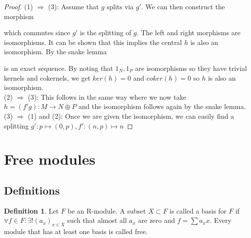 \documentclass{article}
\theoremstyle{definition}
\newtheorem{definition}{Definition}[subsection]
\theoremstyle{remark}
\theoremstyle{plain}
\begin{document}
\begin{proof}
    (1) \(\Rightarrow\) (3): Assume that \(g\) splits via \(g'\). We can then construct the morphism
    \begin{figure}[h]
        \centering
    \end{figure}
    which commutes since \(g'\) is the splitting of \(g\).
    The left and right morphisms are isomorphisms. It can be shown that this implies the central \(h\) is also an isomorphism. By the snake lemma \\
     is an exact sequence. By noting that \(1_N, 1_P\) are isomorphisms so they have trivial kernels and cokernels, we get \(ker(h) = 0\) and \(coker(h) = 0\)
    so \(h\) is also an isomorphism.\\
    (2) \(\Rightarrow\) (3): This follows in the same way where we now take \(h = (f'g): M \to N\oplus P\) and the isomorphism follows again by the snake lemma. \\
    (3) \(\Rightarrow\) (1) and (2): Once we are given the isomorphism, we can easily find a splitting \(g': p \mapsto (0,p), f': (n,p) \mapsto n\)
\end{proof}

\section{Free modules}
\subsection{Definitions}
\begin{definition}
    Let \(F\) be an R-module. A subset \(X \subset F\) is called a basis for \(F\) if \(\forall f \in F: \exists! (a_x)_{x\in X}\) such that 
    almost all \(a_x\) are zero and \(f = \sum a_xx\). Every module that has at least one basis is called free. 
\end{definition}
\end{document}
